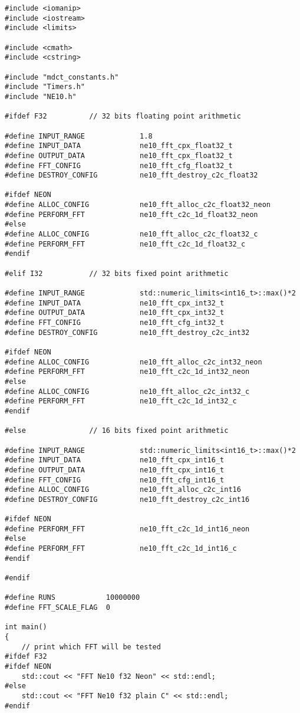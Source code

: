 \documentclass{article}
\begin{document}
\begin{lstlisting}
#include <iomanip>
#include <iostream>
#include <limits>

#include <cmath>
#include <cstring>

#include "mdct_constants.h"
#include "Timers.h"
#include "NE10.h"

#ifdef F32          // 32 bits floating point arithmetic

#define INPUT_RANGE             1.8
#define INPUT_DATA              ne10_fft_cpx_float32_t
#define OUTPUT_DATA             ne10_fft_cpx_float32_t
#define FFT_CONFIG              ne10_fft_cfg_float32_t
#define DESTROY_CONFIG          ne10_fft_destroy_c2c_float32

#ifdef NEON
#define ALLOC_CONFIG            ne10_fft_alloc_c2c_float32_neon
#define PERFORM_FFT             ne10_fft_c2c_1d_float32_neon
#else
#define ALLOC_CONFIG            ne10_fft_alloc_c2c_float32_c
#define PERFORM_FFT             ne10_fft_c2c_1d_float32_c
#endif

#elif I32           // 32 bits fixed point arithmetic

#define INPUT_RANGE             std::numeric_limits<int16_t>::max()*2
#define INPUT_DATA              ne10_fft_cpx_int32_t
#define OUTPUT_DATA             ne10_fft_cpx_int32_t
#define FFT_CONFIG              ne10_fft_cfg_int32_t
#define DESTROY_CONFIG          ne10_fft_destroy_c2c_int32

#ifdef NEON
#define ALLOC_CONFIG            ne10_fft_alloc_c2c_int32_neon
#define PERFORM_FFT             ne10_fft_c2c_1d_int32_neon
#else
#define ALLOC_CONFIG            ne10_fft_alloc_c2c_int32_c
#define PERFORM_FFT             ne10_fft_c2c_1d_int32_c
#endif

#else               // 16 bits fixed point arithmetic

#define INPUT_RANGE             std::numeric_limits<int16_t>::max()*2
#define INPUT_DATA              ne10_fft_cpx_int16_t
#define OUTPUT_DATA             ne10_fft_cpx_int16_t
#define FFT_CONFIG              ne10_fft_cfg_int16_t
#define ALLOC_CONFIG            ne10_fft_alloc_c2c_int16
#define DESTROY_CONFIG          ne10_fft_destroy_c2c_int16

#ifdef NEON
#define PERFORM_FFT             ne10_fft_c2c_1d_int16_neon
#else
#define PERFORM_FFT             ne10_fft_c2c_1d_int16_c
#endif

#endif

#define RUNS            10000000
#define FFT_SCALE_FLAG  0

int main()
{
    // print which FFT will be tested
#ifdef F32
#ifdef NEON
    std::cout << "FFT Ne10 f32 Neon" << std::endl;
#else
    std::cout << "FFT Ne10 f32 plain C" << std::endl;
#endif


\end{lstlisting}
\end{document}
